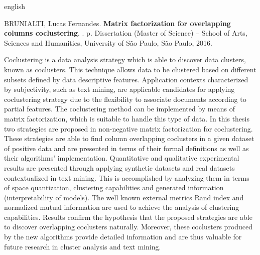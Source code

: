 \documentclass[
    12pt,                %
    oneside,            %
    a4paper,            %
    english,            %
    brazil                %
    ]{abntex2ppgsi}
\begin{document}
%
%
\begin{resumo}[Abstract]
\begin{otherlanguage*}{english}

%
%
%
%
\begin{flushleft}
BRUNIALTI, Lucas Fernandes. \textbf{Matrix factorization for overlapping columns coclustering}. \imprimirdata. \pageref{LastPage} p. Dissertation (Master of Science) – School of Arts, Sciences and Humanities, University of São Paulo, São Paulo, 2016.
\end{flushleft}

Coclustering is a data analysis strategy which is able to discover data clusters, known as coclusters.
This technique allows data to be clustered based on different subsets defined by data descriptive features.
Application contexts characterized by subjectivity, such as text mining, are applicable candidates for applying coclustering strategy due to the flexibility to associate documents according to partial features.
The coclustering method can be implemented by means of matrix factorization, which is suitable to handle this type of data.
In this thesis two strategies are proposed in non-negative matrix factorization for coclustering.
These strategies are able to find column overlapping coclusters in a given dataset of positive data and are presented in terms of their formal definitions as well as their algorithms' implementation.
Quantitative and qualitative experimental results are presented through applying synthetic datasets and real datasets contextualized in text mining.
This is accomplished by analyzing them in terms of space quantization, clustering capabilities and generated information (interpretability of models).
The well known external metrics Rand index and normalized mutual information are used to achieve the analysis of clustering capabilities.
Results confirm the hypothesis that the proposed strategies are able to discover overlapping coclusters naturally.
Moreover, these coclusters produced by the new algorithms provide detailed information and are thus valuable for future research in cluster analysis and text mining.


\end{otherlanguage*}
\end{resumo}
\end{document}
